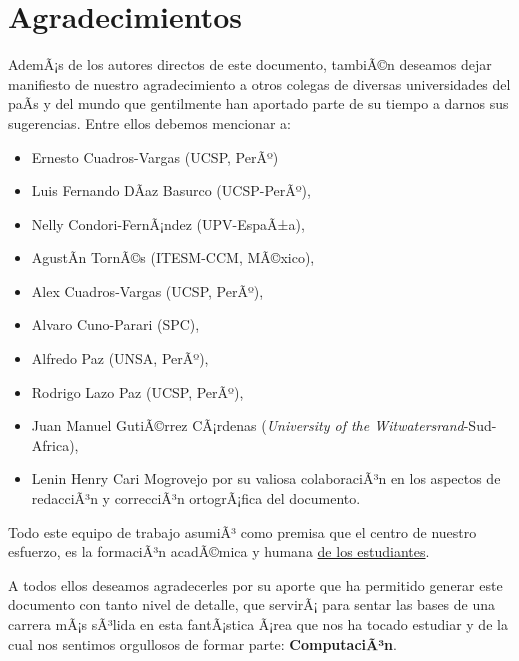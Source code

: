 \chapter*{Agradecimientos}\label{chap:cs-ack}
%

AdemÃ¡s de los autores directos de este documento, tambiÃ©n deseamos dejar manifiesto de nuestro 
agradecimiento a otros colegas de diversas universidades del paÃ­s y del mundo que gentilmente 
han aportado parte de su tiempo a darnos sus sugerencias. Entre ellos debemos mencionar a:

\begin{itemize}
\item Ernesto Cuadros-Vargas (UCSP, PerÃº)
\item Luis Fernando DÃ­az Basurco (UCSP-PerÃº), 
\item Nelly Condori-FernÃ¡ndez (UPV-EspaÃ±a), 
\item AgustÃ­n TornÃ©s (ITESM-CCM, MÃ©xico), 
\item Alex Cuadros-Vargas (UCSP, PerÃº),
\item Alvaro Cuno-Parari (SPC),
\item Alfredo Paz (UNSA, PerÃº), 
\item Rodrigo Lazo Paz (UCSP, PerÃº),
\item Juan Manuel GutiÃ©rrez CÃ¡rdenas (\textit{University of the Witwatersrand}-Sud-Africa),
\item Lenin Henry Cari Mogrovejo por su valiosa colaboraciÃ³n en los aspectos de redacciÃ³n y correcciÃ³n ortogrÃ¡fica del documento.
\end{itemize}

Todo este equipo de trabajo asumiÃ³ como premisa que el centro de nuestro esfuerzo, 
es la formaciÃ³n acadÃ©mica y humana \underline{de los estudiantes}.

A todos ellos deseamos agradecerles por su aporte que ha permitido generar 
este documento con tanto nivel de detalle, que servirÃ¡ para sentar las
bases de una carrera mÃ¡s sÃ³lida en esta fantÃ¡stica Ã¡rea que nos ha tocado estudiar y 
de la cual nos sentimos orgullosos de formar parte: \textbf{ComputaciÃ³n}.
